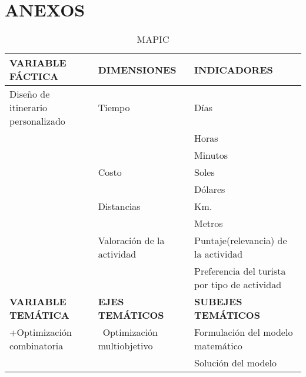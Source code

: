 \chapter{ANEXOS}
\begin{landscape}
\begin{table}[ht]
\centering
\caption{MAPIC}
\label{tab:mapic}
\begin{tabular}{|l|l|l|}
\hline
\textbf{VARIABLE FÁCTICA}            & \textbf{DIMENSIONES}                    & \textbf{INDICADORES}                           \\ \hline
Diseño de itinerario personalizado   & Tiempo                                  & Días                                           \\ \hline
                                     &                                         & Horas                                          \\ \hline
                                     &                                         & Minutos                                        \\ \hline
                                     & Costo                                   & Soles                                          \\ \hline
                                     &                                         & Dólares                                        \\ \hline
                                     & Distancias                              & Km.                                            \\ \hline
                                     &                                         & Metros                                         \\ \hline
                                     & Valoración de la actividad              & Puntaje(relevancia) de la actividad            \\ \hline
                                     &                                         & Preferencia del turista por tipo de actividad  \\ \hline
\textbf{VARIABLE TEMÁTICA}           & \textbf{EJES TEMÁTICOS}                 & \textbf{SUBEJES TEMÁTICOS}                     \\ \hline
+Optimización combinatoria           & ~Optimización multiobjetivo             & Formulación del modelo matemático              \\ \hline
                                     &                                         & Solución del modelo                            \\ \hline

\end{tabular}
\end{table}
\end{landscape}
